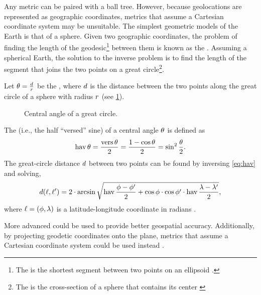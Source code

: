 Any metric can be paired with a ball tree. However, because geolocations are represented as geographic coordinates, metrics that assume a Cartesian coordinate system may be unsuitable. The simplest geometric models of the Earth is that of a sphere. Given two geographic coordinates, the problem of finding the length of the geodesic\footnote{The  is the shortest segment between two points on an ellipsoid \citep{Lu2014}.} between them is known as the  \citep{Sjoberg2012}. Assuming a spherical Earth, the solution to the inverse problem is to find the length of the segment that joins the two points on a great circle\footnote{The  is the cross-section of a sphere that contains its center \citep{Lu2014}}.

Let $\theta = \frac{d}{r}$ be the , where $d$ is the distance between the two points along the great circle of a sphere with radius $r$ (see \cref{fig:central-angle}).

\begin{figure}[htbp]
\centering
{}
\caption[Central angle of a great circle]{Central angle of a great circle.}
\label{fig:central-angle}
\end{figure}

The  (i.e., the half ``versed'' sine) of a central angle $\theta$ is defined as
\begin{equation}
  \operatorname{hav} \theta = \frac{\operatorname{vers} \theta}{2}  = \frac{1 - \cos \theta}{2}= \sin^2 \frac{\theta}{2}.\label{eq:hav}
\end{equation}
The great-circle distance $d$ between two points can be found by inversing \cref{eq:hav} and solving,
\begin{equation*}
  d(\ell, \ell') = 2 \cdot \arcsin \sqrt{\operatorname{hav} \frac{\phi - \phi'}{2} + \cos \phi \cdot \cos \phi' \cdot \operatorname{hav} \frac{\lambda - \lambda'}{2}},
\end{equation*}
where $\ell = (\phi, \lambda)$ is a latitude-longitude coordinate in radians \citep[pp. 157--162]{Brummelen2013}.

More advanced  \citep[pp. 71--130]{Lu2014} could be used to provide better geospatial accuracy. Additionally, by projecting geodetic coordinates onto the plane, metrics that assume a Cartesian coordinate system could be used instead \citep[pp. 265--326]{Lu2014}.